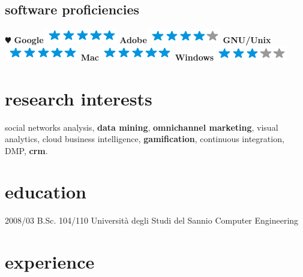 \documentclass[hidelinks]{gabrielebaldassarre-cv}
\begin{document}
\begin{aside}
 \section{software proficiencies}
    {\color{red} $\varheartsuit$} \textbf{Google}\includegraphics[scale=0.40]{img/5stars.png}
    \textbf{Adobe}\includegraphics[scale=0.40]{img/4stars.png}
    \textbf{GNU/Unix}\includegraphics[scale=0.40]{img/5stars.png}
    \textbf{Mac}\includegraphics[scale=0.40]{img/5stars.png}
    \textbf{Windows}\includegraphics[scale=0.40]{img/3stars.png}
\end{aside}

\section{research interests}

social networks analysis, \textbf{data mining}, \textbf{omnichannel marketing}, visual analytics, cloud
business intelligence, \textbf{gamification}, continuous integration, DMP, \textbf{crm}.

\section{education}

\begin{entrylist}
  \entry
    {2008/03}
    {B.Sc. 104/110}
    {Università degli Studi del Sannio}
    {Computer Engineering}
 \end{entrylist}

\section{experience}
\end{document}
